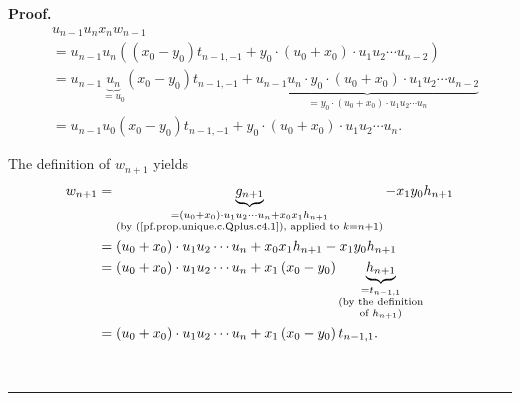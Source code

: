 \documentclass[numbers=enddot,12pt,final,onecolumn,notitlepage]{scrartcl}%
\theoremstyle{definition}
\newenvironment{proof}[1][Proof]{\noindent\textbf{#1.} }{\ \rule{0.5em}{0.5em}}
\newenvironment{verlong}{}{}
\begin{document}
\begin{verlong}
\begin{proof}
\begin{align}
&  u_{n-1}u_{n}x_{n}w_{n-1}\nonumber\\
&  =u_{n-1}u_{n}\left(  \left(  x_{0}-y_{0}\right)  t_{n-1,-1}+y_{0}%
\cdot\left(  u_{0}+x_{0}\right)  \cdot u_{1}u_{2}\cdots u_{n-2}\right)
\nonumber\\
&  =u_{n-1}\underbrace{u_{n}}_{=u_{0}}\left(  x_{0}-y_{0}\right)
t_{n-1,-1}+\underbrace{u_{n-1}u_{n}\cdot y_{0}\cdot\left(  u_{0}+x_{0}\right)
\cdot u_{1}u_{2}\cdots u_{n-2}}_{=y_{0}\cdot\left(  u_{0}+x_{0}\right)  \cdot
u_{1}u_{2}\cdots u_{n}}\nonumber\\
&  =u_{n-1}u_{0}\left(  x_{0}-y_{0}\right)  t_{n-1,-1}+y_{0}\cdot\left(
u_{0}+x_{0}\right)  \cdot u_{1}u_{2}\cdots u_{n}.
\label{pf.prop.unique.c.Qplus.xnwn-1}%
\end{align}


The definition of $w_{n+1}$ yields%
\begin{align}
w_{n+1}  &  =\underbrace{g_{n+1}}_{\substack{=\left(  u_{0}+x_{0}\right)
\cdot u_{1}u_{2}\cdots u_{n}+x_{0}x_{1}h_{n+1}\\\text{(by
(\ref{pf.prop.unique.c.Qplus.c4.1}), applied to }k=n+1\text{)}}}-x_{1}%
y_{0}h_{n+1}\nonumber\\
&  =\left(  u_{0}+x_{0}\right)  \cdot u_{1}u_{2}\cdots u_{n}+x_{0}x_{1}%
h_{n+1}-x_{1}y_{0}h_{n+1}\nonumber\\
&  =\left(  u_{0}+x_{0}\right)  \cdot u_{1}u_{2}\cdots u_{n}+x_{1}\left(
x_{0}-y_{0}\right)  \underbrace{h_{n+1}}_{\substack{=t_{n-1,1}\\\text{(by the
definition}\\\text{of }h_{n+1}\text{)}}}\nonumber\\
&  =\left(  u_{0}+x_{0}\right)  \cdot u_{1}u_{2}\cdots u_{n}+x_{1}\left(
x_{0}-y_{0}\right)  t_{n-1,1}. \label{pf.prop.unique.c.Qplus.wnp1}%
\end{align}



\end{proof}
\end{verlong}
\end{document}

